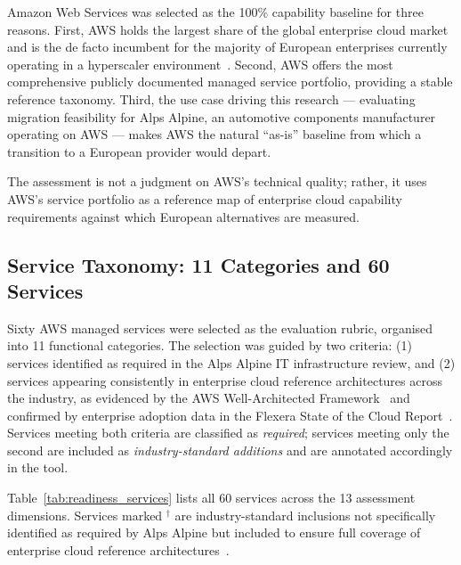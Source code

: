 Amazon Web Services was selected as the 100\% capability baseline for three reasons. First, AWS holds the largest share of the global enterprise cloud market and is the de facto incumbent for the majority of European enterprises currently operating in a hyperscaler environment~\cite{armbrust2010view}. Second, AWS offers the most comprehensive publicly documented managed service portfolio, providing a stable reference taxonomy. Third, the use case driving this research — evaluating migration feasibility for Alps Alpine, an automotive components manufacturer operating on AWS — makes AWS the natural ``as-is'' baseline from which a transition to a European provider would depart.

The assessment is not a judgment on AWS's technical quality; rather, it uses AWS's service portfolio as a reference map of enterprise cloud capability requirements against which European alternatives are measured.

\subsection{Service Taxonomy: 11 Categories and 60 Services}
\label{subsec:service_taxonomy}

Sixty AWS managed services were selected as the evaluation rubric, organised into 11 functional categories. The selection was guided by two criteria: (1) services identified as required in the Alps Alpine IT infrastructure review, and (2) services appearing consistently in enterprise cloud reference architectures across the industry, as evidenced by the AWS Well-Architected Framework~\cite{AWS_WellArchitected_2023} and confirmed by enterprise adoption data in the Flexera State of the Cloud Report~\cite{Flexera_CloudReport_2024}. Services meeting both criteria are classified as \textit{required}; services meeting only the second are included as \textit{industry-standard additions} and are annotated accordingly in the tool.

Table~\ref{tab:readiness_services} lists all 60 services across the 13 assessment dimensions.
Services marked $^{\dagger}$ are industry-standard inclusions not specifically identified as
required by Alps Alpine but included to ensure full coverage of enterprise cloud reference
architectures~\cite{AWS_WellArchitected_2023, Flexera_CloudReport_2024}.

